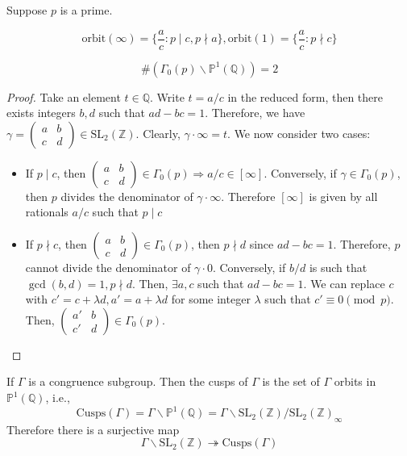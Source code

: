 \documentclass[oneside, 12pt]{scrbook}
\newcommand{\QQ}{\mathbb Q}
\newcommand{\ZZ}{\mathbb Z}
\newcommand{\PP}{\mathbb{P}}
\newcommand{\SL}{\mathrm{SL}}
\newcommand{\bs}{\backslash}
\theoremstyle{theorem}
\begin{document}
Suppose $p$ is a prime.

\begin{proposition}
$$\mathrm{orbit}(\infty) = \{ \frac{a}{c}: p\mid c , p \nmid a\}, \mathrm{orbit}(1) = \{ \frac{a}{c}:p \nmid c\}$$
\end{proposition}
 
\begin{proposition}
$$\# \left( \Gamma_{0}(p)\bs\PP^1(\QQ) \right)=2$$
\end{proposition}

\begin{proof}
Take an element $t\in \QQ$. Write $t = a/c$ in the reduced form, then there exists integers $b,d$ such that $ad-bc=1$. Therefore, we have $\gamma = \begin{pmatrix}
a & b \\ c & d 
\end{pmatrix} \in \SL_{2}(\ZZ)$. Clearly, $\gamma \cdot \infty = t$. We now consider two cases: 
\begin{itemize}
\item If $p \mid c$, then $\begin{pmatrix}
a & b \\ c & d 
\end{pmatrix} \in \Gamma_{0}(p) \Rightarrow a/c \in [\infty]$. Conversely, if $\gamma \in \Gamma_{0}(p)$, then $p$ divides the denominator of $\gamma \cdot \infty$. Therefore $[\infty]$ is given by all rationals $a/c$ such that $p \mid c$
\item If $p \nmid c$, then $\begin{pmatrix}
a & b \\ c & d 
\end{pmatrix} \in \Gamma_{0}(p)$, then $ p \nmid d$ since $ad-bc=1$. Therefore, $p$ cannot divide the denominator of $\gamma \cdot 0$. Conversely, if $b/d $ is such that $\gcd(b,d)=1, p \nmid d$. Then, $\exists a,c$ such that $ad-bc=1$. We can replace $c$ with $c' = c + \lambda d, a' = a + \lambda d$ for some integer $\lambda$ such that $c' \equiv 0 \pmod{p}$. Then, $\begin{pmatrix}
a' & b \\ c' & d 
\end{pmatrix} \in \Gamma_{0}(p)$.  
\end{itemize}
\end{proof}

\begin{definition}
If $\Gamma$ is a congruence subgroup. Then the cusps of $\Gamma$ is the set of $\Gamma$ orbits in $\PP^1(\QQ)$, i.e., $$\mathrm{Cusps}(\Gamma) = \Gamma \bs \PP^1(\QQ) = \Gamma \bs \SL_{2}(\ZZ)/\SL_{2}(\ZZ)_{\infty}$$
Therefore there is a surjective map $$\Gamma \bs \SL_{2}(\ZZ) \twoheadrightarrow \mathrm{Cusps}(\Gamma)$$
\end{definition}
\end{document}
